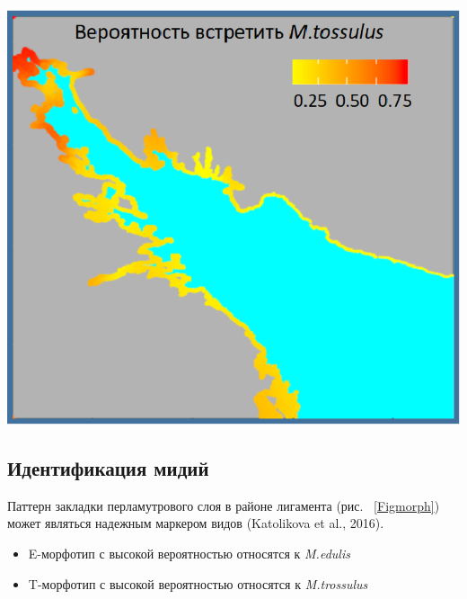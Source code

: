 \documentclass[20pt,a0,portrait]{a0poster}
\begin{document}
\begin{minipage}[t]{0.5\linewidth}
\begin{minipage}[t][10cm][t]{0.4\textwidth}
\end{minipage}\hspace{1cm}
%
\begin{minipage}[t]{0.5\linewidth}
	\begin{center} \vspace{0.1cm}
			\includegraphics[width=0.7\linewidth]{Mytred_distr.png}
			\label{Fig_distred}
		\end{center}\vspace{0.5cm}
\end{minipage}


		\color{DarkSlateGray} %
		
% 
% 


\subsection*{Идентификация мидий}


%
\begin{minipage}[b]{0.4\linewidth}


Паттерн закладки перламутрового слоя в районе лигамента (рис. ~\ref{Figmorph}) может являться надежным маркером видов (Katolikova et al., 2016).   

\begin{itemize}
  \item E-морфотип с высокой вероятностью относятся к \emph{M.edulis} 
  \item  T-морфотип с высокой вероятностью относятся к \emph{M.trossulus}
\end{itemize}
 


\end{minipage}
\end{minipage}
\end{document}
